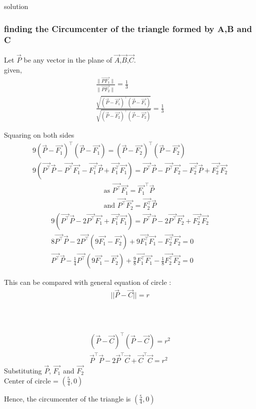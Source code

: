 \documentclass{beamer}
\begin{document}
\begin{frame}{solution}
    \frametitle{finding the Circumcenter of the triangle formed by A,B and C}
Let $\vec{P}$ be any vector in the plane of $\vec{A}$,$\vec{B}$,$\vec{C}$.\\
  given,
\begin{align}
\frac{\| \vec{PF_1} \|}{\| \vec{PF_2} \|} = \frac{1}{3}\\
\frac{\sqrt{(\vec{P}-\vec{F_1})^\top (\vec{P}-\vec{F_1})}}{\sqrt{(\vec{P}-\vec{F_2})^\top (\vec{P}-\vec{F_2})}} = \frac{1}{3}
\end{align}
\end{frame}
\begin{frame}
Squaring on both sides
\begin{align}
9 (\vec{P}-\vec{F_1})^\top (\vec{P}-\vec{F_1}) = (\vec{P}-\vec{F_2})^\top (\vec{P}-\vec{F_2})\\
9 (\vec{P^\top} \vec{P} - \vec{P^\top} \vec{F_1} - \vec{F_1^\top} \vec{P} + \vec{F_1^\top} \vec{F_1}) = \vec{P^\top} \vec{P} - \vec{P^\top} \vec{F_2} - \vec{F_2^\top} \vec{P} + \vec{F_2^\top} \vec{F_2}
\end{align}
\begin{align}
\text{as } \vec{P^\top} \vec{F_1} = \vec{F_1}^\top \vec{P} \\
\text{and } \vec{P^\top} \vec{F_2} = \vec{F_2^\top} \vec{P}
\end{align}
\begin{align}
9 (\vec{P^\top} \vec{P} - 2\vec{P^\top} \vec{F_1} + \vec{F_1^\top} \vec{F_1}) = \vec{P^\top} \vec{P} - 2\vec{P^\top} \vec{F_2} + \vec{F_2^\top} \vec{F_2}\\
8 \vec{P^\top} \vec{P} - 2\vec{P^\top} (9\vec{F_1}-\vec{F_2}) +9\vec{F_1^\top} \vec{F_1} - \vec{F_2^\top} \vec{F_2} = 0\\
\vec{P^\top} \vec{P} - \frac{1}{4} \vec{P^\top} (9\vec{F_1}-\vec{F_2}) + \frac{9}{8} \vec{F_1^\top} \vec{F_1} - \frac{1}{8} \vec{F_2^\top} \vec{F_2} = 0
\end{align}
\end{frame}
\begin{frame}
This can be compared with general equation of circle :
\begin{align}
||\vec{P} - \vec{C}|| = r\\
\end{align}
\\
\\
\end{frame}
\begin{frame}
\begin{align}
(\vec{P}-\vec{C})^\top(\vec{P}-\vec{C}) = r^2\\
\vec{P}^\top\vec{P} -2\vec{P}^\top\vec{C}+\vec{C}^\top\vec{C}=r^2
\end{align}
Substituting $\Vec{P}$, $\vec{F_1}$ and $\vec{F_2}$\\
Center of circle =  $\left(\frac{5}{4}, 0\right)$

Hence, the circumcenter of the triangle is $\left(\frac{5}{4}, 0\right)$
\end{frame}
\end{document}
